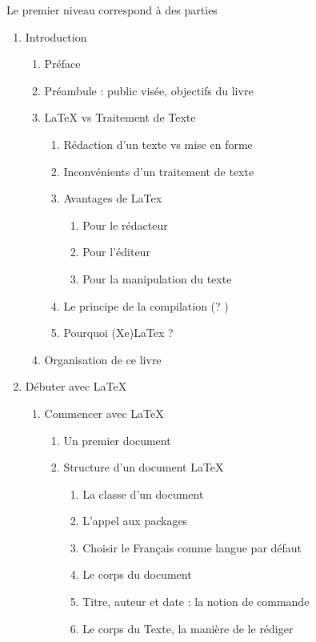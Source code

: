 Le premier niveau correspond à des parties
\begin{enumerate}
\item Introduction
	
	\begin{enumerate}
	\item Préface
	\item Préambule : public visée, objectifs du livre
	\item LaTeX vs Traitement de Texte
		\begin{enumerate}
		\item Rédaction d'un texte vs mise en forme
		\item Inconvénients d'un traitement de texte
		\item Avantages de LaTex
		\begin{enumerate}
			\item Pour le rédacteur
			\item Pour l'éditeur
			\item Pour la manipulation du texte
		\end{enumerate}
		\item Le principe de la compilation  (? )
		\item Pourquoi (Xe)LaTex ?
		\end{enumerate}
	\item Organisation de ce livre
	\end{enumerate}
\item Débuter avec LaTeX
\begin{enumerate}
	\item Commencer avec LaTeX
	\begin{enumerate}
		\item Un premier document
		\item Structure d'un document LaTeX
		\begin{enumerate}
			\item La classe d'un document
			\item L'appel aux packages
			\item Choisir le Français comme langue par défaut
			\item Le corps du document
			\item Titre, auteur et date : la notion de commande
			\item Le corps du Texte, la manière de le rédiger

\end{enumerate}
\end{enumerate}
\end{enumerate}
\end{enumerate}
